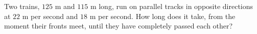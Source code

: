 Two trains, $125$ m and $115$ m long, run on parallel tracks in opposite directions at $22$ m per second and $18$ m per second. How long does it take, from the moment their fronts meet, until they have completely passed each other?

